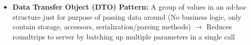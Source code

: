 \documentclass[landscape]{article}
\begin{document}
\begin{multicols*}{5}
\begin{itemize}
      \item \textbf{Data Transfer Object (DTO) Pattern:} A group of values in an ad-hoc structure just for purpose of passing data around (No business logic, only contain storage, accessors, serialization/parsing methods) $\rightarrow$ Reduces roundtrips to server by batching up multiple parameters in a single call
    \end{itemize}
\end{multicols*}
\end{document}
